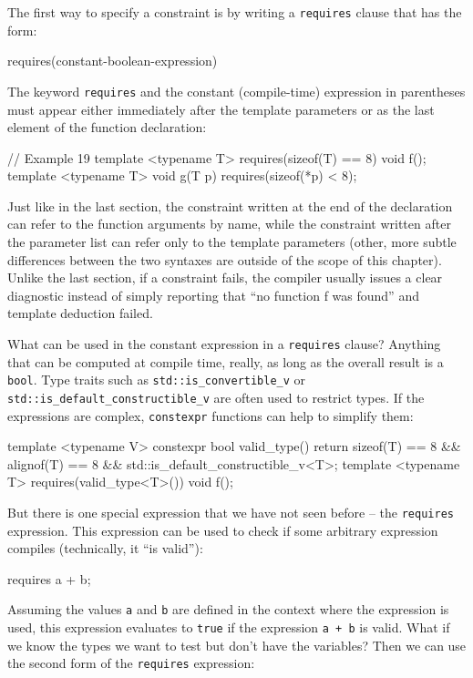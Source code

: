The first way to specify a constraint is by writing a \texttt{requires} clause that has the form:

\begin{code}
requires(constant-boolean-expression)
\end{code}

The keyword \texttt{requires} and the constant (compile-time) expression in parentheses must appear either immediately after the template parameters or as the last element of the function declaration:

\begin{code}
// Example 19
template <typename T> requires(sizeof(T) == 8) void f();
template <typename T> void g(T p) requires(sizeof(*p) < 8);
\end{code}

Just like in the last section, the constraint written at the end of the declaration can refer to the function arguments by name, while the constraint written after the parameter list can refer only to the template parameters (other, more subtle differences between the two syntaxes are outside of the scope of this chapter). Unlike the last section, if a constraint fails, the compiler usually issues a clear diagnostic instead of simply reporting that ``no function f was found'' and template deduction failed.

What can be used in the constant expression in a \texttt{requires} clause? Anything that can be computed at compile time, really, as long as the overall result is a \texttt{bool}. Type traits such as \texttt{std::is\_convertible\_v} or \texttt{std::is\_default\_constructible\_v} are often used to restrict types. If the expressions are complex, \texttt{constexpr} functions can help to simplify them:

\begin{code}
template <typename V> constexpr bool valid_type() {
  return sizeof(T) == 8 && alignof(T) == 8 &&
    std::is_default_constructible_v<T>;
}
template <typename T> requires(valid_type<T>()) void f();
\end{code}

But there is one special expression that we have not seen before -- the \texttt{requires} expression. This expression can be used to check if some arbitrary expression compiles (technically, it ``is valid''):

\begin{code}
requires { a + b; }
\end{code}

Assuming the values \texttt{a} and \texttt{b} are defined in the context where the expression is used, this expression evaluates to \texttt{true} if the expression \texttt{a\ +\ b} is valid. What if we know the types we want to test but don't have the variables? Then we can use the second form of the \texttt{requires} expression:

